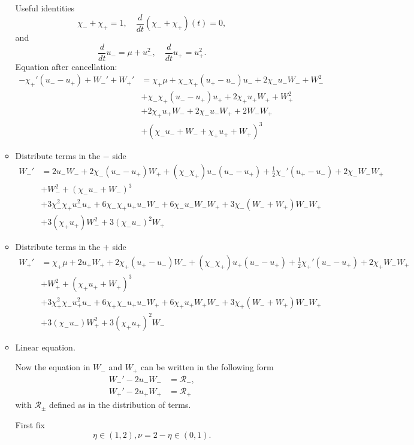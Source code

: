 \documentclass[letterpaper,11pt]{article}
\numberwithin{equation}{section}
\theoremstyle{plain}
\begin{document}
\begin{enumerate}
\begin{itemize}
Useful identities 
\[
\chi_-+\chi_+ = 1, \quad \frac{d}{dt}(\chi_-+\chi_+)(t) = 0,
\]
and
\[ 
 \frac{d}{dt} u_- = \mu+ u_-^2, \quad \frac{d}{dt} u_+ = u_+^2.
 \]
Equation after cancellation:
\begin{align*}
-\chi_+'(u_- -u_+) +W_-'+W_+' &= \chi_+\mu +\chi_-\chi_+(u_+ - u_-)u_- +2\chi_- u_- W_- +W_-^2 \\
&+\chi_-\chi_+(u_- -u_+)u_+ + 2\chi_+ u_+W_+ + W_+^2 \\
&+ 2\chi_+ u_+ W_- + 2\chi_- u_- W_+ + 2W_-W_+\\
&+ (\chi_-u_-+W_- + \chi_+u_+ +W_+)^3
\end{align*}

\item Distribute terms in the $-$ side 
\begin{align*}
W_-'  &= 2u_-W_- +2\chi_-(u_- -u_+)W_+ + (\chi_-\chi_+) u_-(u_- -u_+)+\frac{1}{2}\chi_-'(u_+ -u_-) +2\chi_-W_-W_+\\
&+W_-^2+ (\chi_-u_- + W_-)^3\\
&+ 3\chi_-^2\chi_+ u_-^2 u_+  + 6\chi_-\chi_+ u_+ u_-W_- + 6\chi_- u_- W_- W_+ + 3\chi_-(W_-+W_+)W_-W_+ \\&+3(\chi_+u_+)W_-^2 + 3(\chi_-u_-)^2W_+
\end{align*}

\item Distribute terms in the $+$ side 
\begin{align*}
W_+'  &=  \chi_+\mu+2u_+W_+ + 2\chi_+(u_+ -u_-)W_-+ (\chi_-\chi_+) u_+(u_- -u_+)+\frac{1}{2}\chi_+'(u_- -u_+) +2\chi_+W_-W_+\\
&+W_+^2+ (\chi_+u_+ + W_+)^3 \\
&+ 3\chi_+^2\chi_-u_+^2u_- + 6\chi_+\chi_- u_+u_- W_+ +6 \chi_+u_+W_+W_- +3\chi_+(W_-+W_+)W_-W_+\\
&+3(\chi_-u_-)W_+^2 + 3(\chi_+u_+)^2W_-
\end{align*}


\pagebreak
\item Linear equation.

Now the equation in $W_-$ and $W_+$ can be written in the following form
\begin{align*}
W_-' - 2u_- W_- &= \mathcal{R}_- ,\\
W_+' - 2u_+ W_+ &= \mathcal{R}_+
\end{align*}
with $\mathcal{R}_{\pm}$ defined as in the distribution of terms.

First fix
\[
\eta \in (1,2), \nu = 2-\eta\in (0,1).
\]


\end{itemize}
\end{enumerate}
\end{document}
